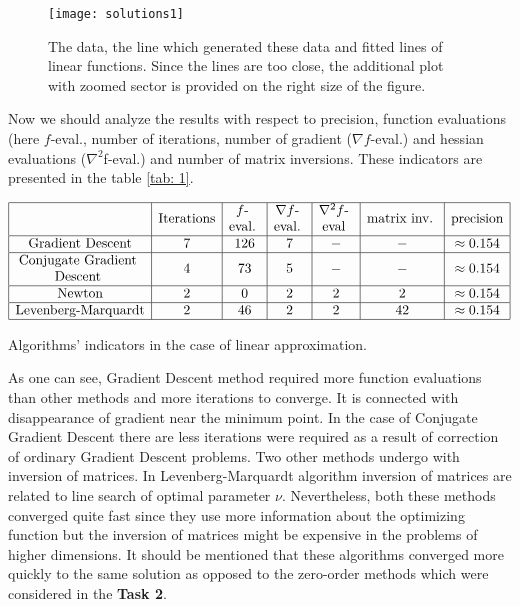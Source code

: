 \documentclass[12pt, bachelor, substylefile = algo_title.rtx]{disser}
\makeatletter
\newcommand{\specialcell}[2][c]{%
  \begin{tabular}[#1]{@{}c@{}}#2\end{tabular}}
\theoremstyle{definition}
\makeatother
\begin{document}
\begin{figure}[h]
\begin{center}
\texttt{[image: solutions1]}
\caption{The data, the line which generated these data and fitted lines of linear functions. Since the lines are too close, the additional plot with zoomed sector is provided on the right size of the figure.}
\label{fig: 2}
\end{center}
\end{figure}

Now we should analyze the results with respect to precision, function evaluations (here $f$-eval., number of iterations, number of gradient ($\nabla f$-eval.) and hessian evaluations ($\nabla^2 $f-eval.) and number of matrix inversions. These indicators are presented in the table \ref{tab: 1}.

\begin{table}[h]
$$
\begin{array}{|c|c|c|c|c|c|c|}
\hline
 & \text{Iterations} & \text{\specialcell{ $f$-\\eval.} }& \text{\specialcell{ $\nabla f$-\\eval.} } & \text{\specialcell{ $\nabla^2 f$-\\eval} } & \text{\specialcell{ matrix inv. } } &\text{precision}\\
\hline
\text{Gradient Descent} & 7 & 126 & 7 & - & - & \approx 0.154 \\ 
\hline
\text{\specialcell{ Conjugate Gradient\\ Descent } } & 4 & 73 & 5 & - & - &\approx 0.154 \\
\hline
\text{Newton} & 2 & 0 & 2 & 2& 2 & \approx 0.154 \\
\hline
\text{Levenberg-Marquardt} & 2 & 46 & 2 & 2 & 42 & \approx 0.154 \\
\hline
\end{array}
$$
\caption{Algorithms' indicators in the case of linear approximation.}
\label{tab: 1}
\end{table}

As one can see, Gradient Descent method required more function evaluations than other methods and more iterations to converge. It is connected with disappearance of gradient near the minimum point. In the case of Conjugate Gradient Descent there are less iterations were required as a result of correction of ordinary Gradient Descent problems. Two other methods undergo with inversion of matrices. In Levenberg-Marquardt algorithm inversion of matrices are related to line search of optimal parameter $\nu$. Nevertheless, both these methods converged quite fast since they use more information about the optimizing function but the inversion of matrices might be expensive in the problems of higher dimensions. It should be mentioned that these algorithms converged more quickly to the same solution as opposed to the zero-order methods which were considered in the \textbf{Task 2}.
\end{document}
